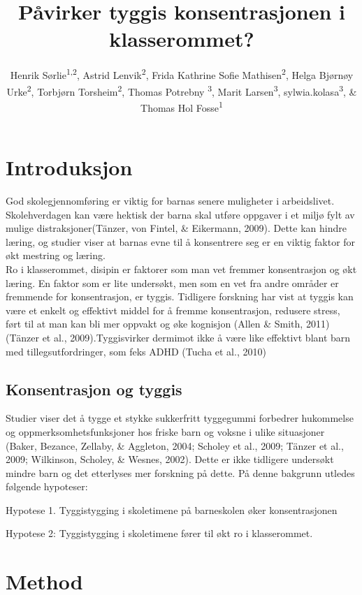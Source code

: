 \documentclass[man]{apa6}
\title{Påvirker tyggis konsentrasjonen i klasserommet?}
\author{Henrik Sørlie\textsuperscript{1,2}, Astrid Lenvik\textsuperscript{2}, Frida Kathrine Sofie Mathisen\textsuperscript{2}, Helga Bjørnøy Urke\textsuperscript{2}, Torbjørn Torsheim\textsuperscript{2}, Thomas Potrebny \textsuperscript{3}, Marit Larsen\textsuperscript{3}, sylwia.kolasa\textsuperscript{3}, \& Thomas Hol Fosse\textsuperscript{1}}
\date{}
\affiliation{
\vspace{0.5cm}
\textsuperscript{1} Forsvarets høgskole\\\textsuperscript{2} Universitetet i Bergen\\\textsuperscript{3} Hoegskulen på Vestlandet\\\textsuperscript{4} Norce}
\begin{document}
\maketitle

\hypertarget{introduksjon}{%
\section{Introduksjon}\label{introduksjon}}

God skolegjennomføring er viktig for barnas senere muligheter i arbeidslivet.
Skolehverdagen kan være hektisk der barna skal utføre oppgaver i et miljø fylt av mulige distraksjoner(Tänzer, von Fintel, \& Eikermann, 2009).
Dette kan hindre læring, og studier viser at barnas evne til å konsentrere seg er en viktig faktor for økt mestring og læring.\\
Ro i klasserommet, disipin er faktorer som man vet fremmer konsentrasjon og økt læring.
En faktor som er lite undersøkt, men som en vet fra andre områder er fremmende for konsentrasjon, er tyggis.
Tidligere forskning har vist at tyggis kan være et enkelt og effektivt middel for å fremme konsentrasjon, redusere stress, ført til at man kan bli mer oppvakt og øke kognisjon (Allen \& Smith, 2011)(Tänzer et al., 2009).Tyggisvirker dermimot ikke å være like effektivt blant barn med tillegsutfordringer, som feks ADHD (Tucha et al., 2010)

\hypertarget{konsentrasjon-og-tyggis}{%
\subsection{Konsentrasjon og tyggis}\label{konsentrasjon-og-tyggis}}

Studier viser det å tygge et stykke sukkerfritt tyggegummi forbedrer hukommelse og oppmerksomhetsfunksjoner hos friske barn og voksne i ulike situasjoner (Baker, Bezance, Zellaby, \& Aggleton, 2004; Scholey et al., 2009; Tänzer et al., 2009; Wilkinson, Scholey, \& Wesnes, 2002). Dette er ikke tidligere undersøkt mindre barn og det etterlyses mer forskning på dette.
På denne bakgrunn utledes følgende hypoteser:

Hypotese 1. Tyggistygging i skoletimene på barneskolen øker konsentrasjonen

Hypotese 2: Tyggistygging i skoletimene fører til økt ro i klasserommet.

\hypertarget{method}{%
\section{Method}\label{method}}
\end{document}
